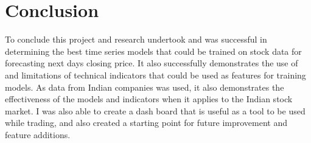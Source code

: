 \section{Conclusion}

To conclude this project and research undertook and was successful in determining the best time series models that could be trained on stock data for forecasting next days closing price. It also successfully demonstrates the use of and limitations of technical indicators that could be used as features for training models. As data from Indian companies was used, it also demonstrates the effectiveness of the models and indicators when it applies to the Indian stock market. I was also able to create a dash board that is useful as a tool to be used while trading, and also created a starting point for future improvement and feature additions.